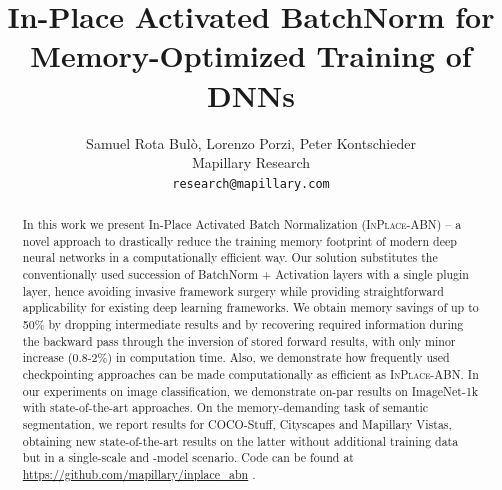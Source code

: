 \documentclass[10pt,twocolumn,letterpaper]{article}
\newcommand{\bnInplace}{\textsc{InPlace-ABN}\xspace}
\begin{document}
\title{In-Place Activated BatchNorm for Memory-Optimized Training of DNNs}

\author{Samuel Rota Bul\`o, Lorenzo Porzi, Peter Kontschieder\\
Mapillary Research\\
{\tt\small research@mapillary.com}
}

\maketitle



\begin{abstract}
In this work we present In-Place Activated Batch Normalization (\bnInplace) -- a novel approach to drastically reduce the training memory footprint of modern deep neural networks in a computationally efficient way. Our solution substitutes the conventionally used succession of BatchNorm + Activation layers with a single plugin layer, hence avoiding invasive framework surgery while providing straightforward applicability for existing deep learning frameworks. We obtain memory savings of up to 50\% by dropping intermediate results and by recovering required information during the backward pass through the inversion of stored forward results, with only minor increase ($0.8$-$2\%$) in computation time. Also, we demonstrate how frequently used checkpointing approaches can be made computationally as efficient as \bnInplace. In our experiments on image classification, we demonstrate on-par results on ImageNet-1k with state-of-the-art approaches. On the memory-demanding task of semantic segmentation, we report results for COCO-Stuff, Cityscapes and Mapillary Vistas, obtaining new state-of-the-art results on the latter without additional training data but in a single-scale and -model scenario. Code can be found at \url{https://github.com/mapillary/inplace_abn} .
\end{abstract}
\end{document}
